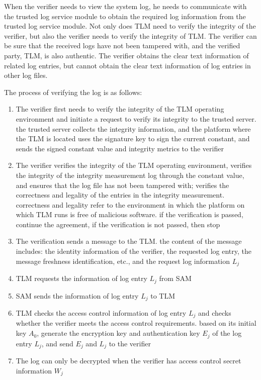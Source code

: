 \documentclass[11pt]{article}
\begin{document}
When the verifier needs to view the system log, he needs to communicate with the trusted log service module to obtain the required log information from the trusted log service module. 
Not only does TLM need to verify the integrity of the verifier, but also the verifier needs to verify the integrity of TLM. 
The verifier can be sure that the received logs have not been tampered with, and the verified party, TLM, is also authentic. 
The verifier obtains the clear text information of related log entries, but cannot obtain the clear text information of log entries in other log files.

The process of verifying the log is as follows:
\begin{enumerate}
    \item The verifier first needs to verify the integrity of the TLM operating environment and initiate a request to verify its integrity to the trusted server. 
    the trusted server collects the integrity information, and the platform where the TLM is located uses the signature key to sign the current constant, and sends the signed constant value and integrity metrics to the verifier
    \item The verifier verifies the integrity of the TLM operating environment, verifies the integrity of the integrity measurement log through the constant value, and ensures that the log file has not been tampered with; verifies the correctness and legality of the entries in the integrity measurement. 
    correctness and legality refer to the environment in which the platform on which TLM runs is free of malicious software. 
    if the verification is passed, continue the agreement, if the verification is not passed, then stop
    \item The verification sends a message to the TLM. the content of the message includes: the identity information of the verifier, the requested log entry, the message freshness identification, etc., and the request log information $L_j$
    \item TLM requests the information of log entry $L_j$ from SAM
    \item SAM sends the information of log entry $L_j$ to TLM
    \item TLM checks the access control information of log entry $L_j$ and checks whether the verifier meets the access control requirements. 
    based on its initial key $A_0$, generate the encryption key and authentication key $E_j$ of the log entry $L_j$, and send $E_j$ and $L_j$ to the verifier
    \item The log can only be decrypted when the verifier has access control secret information $W_j$
\end{enumerate}
\end{document}
